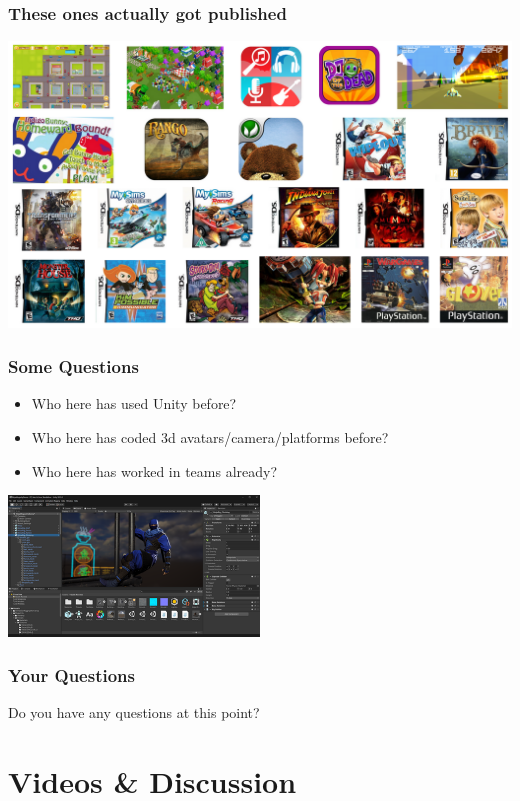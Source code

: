 \documentclass{beamer}
\begin{document}
\begin{frame}
    \frametitle{These ones actually got published}
    \includegraphics[width=\textwidth]{seangames1.png}
\end{frame}

\begin{frame}
    \frametitle{Some Questions}
    \begin{multicols}{2}

        \begin{itemize}
            \item Who here has used Unity before?
            \item Who here has coded 3d avatars/camera/platforms before?
            \item Who here has worked in teams already?
        \end{itemize}
        \columnbreak
        \includegraphics[width=0.5\textwidth]{./Unity_Engine_Screenshot.png}
    \end{multicols}
\end{frame}

\begin{frame}
    \frametitle{Your Questions}
    Do you have any questions at this point?
\end{frame}


\section{Videos \& Discussion}
\end{document}
